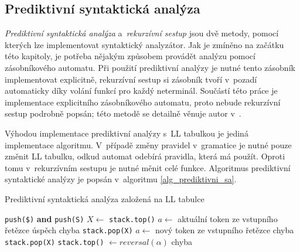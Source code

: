 \subsection*{Prediktivní syntaktická analýza}
\emph{Prediktivní syntaktická analýza} a~\emph{rekurzívní sestup} jsou dvě metody, pomocí kterých lze implementovat syntaktický analyzátor.
Jak je zmíněno na začátku této kapitoly, je potřeba nějakým způsobem provádět analýzu pomocí zásobníkového automatu.
Při použití prediktivní analýzy je nutné tento zásobník implementovat explicitně, rekurzívní sestup si zásobník tvoří v~pozadí automaticky díky volání funkcí pro každý neterminál.
Součástí této práce je implementace explicitního zásobníkového automatu, proto nebude rekurzívní sestup podrobně popsán; této metodě se detailně věnuje autor v~\cite{medunaElementsOfCompDesign}.

Výhodou implementace prediktivní analýzy s~LL tabulkou je jediná implementace algoritmu.
V~případě změny pravidel v~gramatice je nutné pouze změnit LL tabulku, odkud automat odebírá pravidla, která má použít.
Oproti tomu v~rekurzívním sestupu je nutné měnit celé funkce.
Algoritmus prediktivní syntaktické analýzy je popsán v~algoritmu \ref{alg_prediktivni_sa}.
\begin{algorithm}[ht]
    \caption{Prediktivní syntaktická analýza založená na LL tabulce}
    \label{alg_prediktivni_sa}
    \begin{algorithmic}[1]
        \NewLine
        \State \texttt{push(\$)} \textbf{and} \texttt{push(S)}
        \Repeat
            \State $X \gets$ \texttt{stack.top()}
            \State $a \gets$ aktuální token ze vstupního řetězce
                    \State úspěch
                \Else 
                    \State chyba
                \EndIf
                    \State \texttt{stack.pop(X)}
                    \State $a \gets$ nový token ze vstupního řetězce
                \Else
                    \State chyba
                \EndIf
                    \State \texttt{stack.pop(X)}
                    \State \texttt{stack.top()} $\gets reversal(\alpha)$
                \Else
                    \State chyba
                \EndIf
                \EndIf
    \end{algorithmic}
\end{algorithm}

